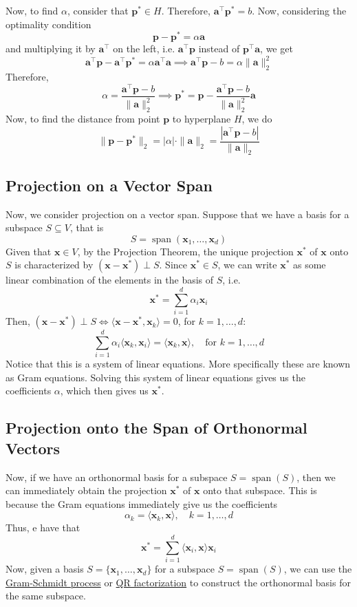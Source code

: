 \documentclass[12pt]{article}
\begin{document}
\noindent Now, to find $\alpha$, consider that $\mathbf{p}^*\in H$. Therefore, $\mathbf{a}^\top\mathbf{p}^*=b$. Now, considering the optimality condition $$\mathbf{p}-\mathbf{p}^* = \alpha\mathbf{a}$$ and multiplying it by $\mathbf{a}^\top$ on the left, i.e. $\mathbf{a}^\top\mathbf{p}$ instead of $\mathbf{p}^\top\mathbf{a}$, we get $$\mathbf{a}^\top\mathbf{p} - \mathbf{a}^\top\mathbf{p}^* = \alpha\mathbf{a}^\top\mathbf{a}\implies \mathbf{a}^\top\mathbf{p} - b = \alpha\|\mathbf{a}\|_2^2$$ Therefore, $$\alpha = \frac{\mathbf{a}^\top\mathbf{p} - b}{\|\mathbf{a}\|_2^2}\implies \mathbf{p}^* = \mathbf{p} - \frac{\mathbf{a}^\top\mathbf{p} - b}{\|\mathbf{a}\|_2^2}\mathbf{a}$$ Now, to find the distance from point $\mathbf{p}$ to hyperplane $H$, we do $$\|\mathbf{p}-\mathbf{p}^*\|_2 = |\alpha|\cdot \|\mathbf{a}\|_2 = \frac{|\mathbf{a}^\top\mathbf{p} - b|}{\|\mathbf{a}\|_2}$$

\subsection{Projection on a Vector Span}
Now, we consider projection on a vector span. Suppose that we have a basis for a subspace $S\subseteq V$, that is 
$$S = \operatorname{span}(\mathbf{x}_1,\ldots,\mathbf{x}_d)$$ Given that $\mathbf{x}\in V$, by the Projection 
Theorem, the unique projection $\mathbf{x}^*$ of  $\mathbf{x}$ onto $S$ is characterized by $(\mathbf{x}-\mathbf{x}
^*)\perp S$. Since $\mathbf{x}^*\in S$, we can write $\mathbf{x}^*$ as some linear combination of the elements in 
the basis of $S$, i.e. $$\mathbf{x}^* = \sum_{i=1}^d\alpha_i\mathbf{x}_i$$ Then, $(\mathbf{x}-\mathbf{x}^*)\perp 
S\iff \langle \mathbf{x}-\mathbf{x}^*, \mathbf{x}_k\rangle = 0$, for $k=1,\ldots,d$: $$\sum_{i=1}^d \alpha_i\langle 
\mathbf{x}_k, \mathbf{x}_i\rangle = \langle \mathbf{x}_k,\mathbf{x}\rangle,\quad\text{for } k=1,\ldots,d$$ Notice that 
this is a system of linear equations. More specifically these are known as Gram equations. Solving this system of 
linear equations gives us the coefficients $\alpha$, which then gives us $\mathbf{x}^*$.

\subsection{Projection onto the Span of Orthonormal Vectors}
Now, if we have an orthonormal basis for a subspace $S = \operatorname{span}(S)$, then we can immediately obtain the projection $\mathbf{x}^*$ of $\mathbf{x}$ onto that subspace. This is because the Gram equations immediately give us the coefficients $$\alpha_k = \langle\mathbf{x}_k,\mathbf{x}\rangle, \quad k = 1,\ldots, d$$ Thus, e have that $$\mathbf{x}^* = \sum_{i=1}^d\langle\mathbf{x}_i,\mathbf{x}\rangle\mathbf{x}_i$$ Now, given a basis $S = \{\mathbf{x}_1,\ldots,\mathbf{x}_d\}$ for a subspace $S = \operatorname{span}(S)$, we can use the \href{https://en.wikipedia.org/wiki/Gram%E2%80%93Schmidt_process}{Gram-Schmidt process} or \href{https://en.wikipedia.org/wiki/QR_decomposition}{QR factorization} to construct the orthonormal basis for the same subspace.
\end{document}
